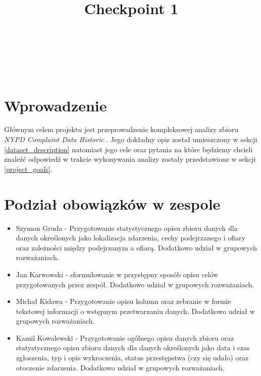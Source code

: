 \documentclass{classrep}
\author{%
    \studentinfo[239661@edu.p.lodz.pl]{Szymon Gruda}{239661}\\
    \studentinfo[239671@edu.p.lodz.pl]{Jan Karwowski}{239671}\\
    \studentinfo[239673@edu.p.lodz.pl]{Michał Kidawa}{239673}\\
    \studentinfo[239676@edu.p.lodz.pl]{Kamil Kowalewski}{239676}\\
}
\title{Checkpoint 1}
\begin{document}
    \maketitle
    \thispagestyle{fancyplain}

    \tableofcontents
    \newpage

    \section{Wprowadzenie} {
        Głównym celem projektu jest przeprowadzenie kompleksowej analizy zbioru
        \textit{NYPD Complaint Data Historic} \cite{nypd_dataset}. Jego dokładny opis
        został umieszczony w sekcji \ref{dataset_description} natomiast jego cele oraz
        pytania na które będziemy chcieli znaleźć odpowiedź w trakcie wykonywania
        analizy zostały przedstawione w sekcji \ref{project_goals}.
    }

    \section{Podział obowiązków w zespole} {
        \begin{itemize}
            \item Szymon Gruda - Przygotowanie statystycznego opisu zbioru danych dla
            danych określonych jako lokalizacja zdarzenia, cechy podejrzanego i
            ofiary oraz zależności między podejrzanym a ofiarą. Dodatkowo udział
            w grupowych rozważaniach.
            \item Jan Karwowski - sformułowanie w przystępny sposób opisu celów
            przygotowanych przez zespół. Dodatkowo udział w grupowych rozważaniach.
            \item Michał Kidawa - Przygotowanie opisu kolumn oraz zebranie w formie
            tekstowej informacji o wstępnym przetwarzaniu danych. Dodatkowo
            udział w grupowych rozważaniach.
            \item Kamil Kowalewski - Przygotowanie ogólnego opisu danych zbioru oraz
            statystycznego opisu zbioru danych dla danych określonych jako data i
            czas zgłoszenia, typ i opis wykroczenia, status przestępstwa (czy się
            udało) oraz otoczenie zdarzenia. Dodatkowo udział w grupowych
            rozważaniach.
        \end{itemize}
    }
\end{document}
